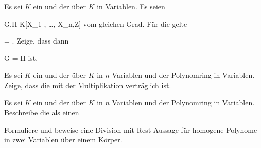 {}
{





Es sei $K$ ein
 und
 der
 über $K$ in
 Variablen. Es seien

\mavergleichskette
{\vergleichskette
{ G,H
}
{ \in }{ K[X_1 , \ldots , X_n,Z]
}
{  }{
}
{    }{
}
{   }{
}
}
{}{}{}
vom gleichen Grad. Für die
 {} {}
gelte

\mavergleichskette
{\vergleichskette
{ 
}
{ = }{ 
}
{  }{
}
{    }{
}
{   }{
}
}
{}{}{.}
Zeige, dass dann

\mavergleichskette
{\vergleichskette
{ G
}
{ = }{ H
}
{  }{
}
{    }{
}
{   }{
}
}
{}{}{}
ist.





}
{} {}

{}
{





Es sei $K$ ein
und
 der
über $K$ in $n$ Variablen und
 der Polynomring in
 Variablen. Zeige, dass die
 {} {}
mit der Multiplikation verträglich ist.





}
{} {}

{}
{





Es sei $K$ ein
und
 der
über $K$ in $n$ Variablen und
 der Polynomring in
 Variablen. Beschreibe die
 {} {}
als einen





}
{} {}

{}
{





Formuliere und beweise eine Division mit Rest-Aussage für homogene Polynome in zwei Variablen über einem Körper.





}
{} {}

